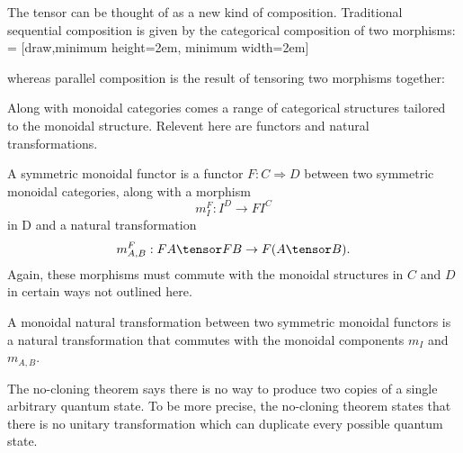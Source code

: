 The tensor can be thought of as a new kind of composition. Traditional
sequential composition is given by the categorical composition of two morphisms:
 = [draw,minimum height=2em, minimum width=2em]
\begin{center}  \end{center}
whereas parallel composition is the result of tensoring two morphisms together:
\begin{center}  \end{center}


Along with monoidal categories comes a range of categorical structures tailored
to the monoidal structure. Relevent here are functors and natural transformations.

\begin{definition}
A symmetric monoidal functor is a functor $F : C \Rightarrow D$ between two symmetric
monoidal categories, along with a morphism
\[ m_I^F : I^D \rightarrow F I^C \]
in D and a natural transformation
\[ m_{A,B}^F : F A \tensor F B \rightarrow F(A \tensor B). \]
Again, these morphisms must commute with the monoidal structures in $C$ and $D$
in certain ways not outlined here. 
\end{definition}

A monoidal natural transformation between two symmetric monoidal functors
is a natural transformation that commutes with the monoidal components $m_I$ and $m_{A,B}$.

The no-cloning theorem says there is no way to produce two copies of a single 
arbitrary quantum state. To be more precise, the no-cloning theorem states that
there is no unitary transformation which can duplicate every possible quantum state.

